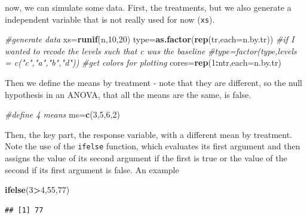 \documentclass[
]{book}
\newenvironment{Shaded}{\begin{snugshade}}{\end{snugshade}}
\newcommand{\AttributeTok}[1]{\textcolor[rgb]{0.13,0.29,0.53}{#1}}
\newcommand{\CommentTok}[1]{\textcolor[rgb]{0.56,0.35,0.01}{\textit{#1}}}
\newcommand{\DecValTok}[1]{\textcolor[rgb]{0.00,0.00,0.81}{#1}}
\newcommand{\FunctionTok}[1]{\textcolor[rgb]{0.13,0.29,0.53}{\textbf{#1}}}
\newcommand{\NormalTok}[1]{#1}
\newcommand{\OtherTok}[1]{\textcolor[rgb]{0.56,0.35,0.01}{#1}}
\newcommand{\SpecialCharTok}[1]{\textcolor[rgb]{0.81,0.36,0.00}{\textbf{#1}}}
\begin{document}
now, we can simulate some data. First, the treatments, but we also generate a independent variable that is not really used for now (\texttt{xs}).

\begin{Shaded}
\begin{Highlighting}[]
\CommentTok{\#generate data}
\NormalTok{xs}\OtherTok{=}\FunctionTok{runif}\NormalTok{(n,}\DecValTok{10}\NormalTok{,}\DecValTok{20}\NormalTok{)}
\NormalTok{type}\OtherTok{=}\FunctionTok{as.factor}\NormalTok{(}\FunctionTok{rep}\NormalTok{(tr,}\AttributeTok{each=}\NormalTok{n.by.tr))}
\CommentTok{\#if I wanted to recode the levels such that c was the baseline}
\CommentTok{\#type=factor(type,levels = c("c","a","b","d"))}
\CommentTok{\#get colors for plotting}
\NormalTok{cores}\OtherTok{=}\FunctionTok{rep}\NormalTok{(}\DecValTok{1}\SpecialCharTok{:}\NormalTok{ntr,}\AttributeTok{each=}\NormalTok{n.by.tr)}
\end{Highlighting}
\end{Shaded}

Then we define the means by treatment - note that they are different, so the null hypothesis in an ANOVA, that all the means are the same, is false.

\begin{Shaded}
\begin{Highlighting}[]
\CommentTok{\#define 4 means}
\NormalTok{ms}\OtherTok{=}\FunctionTok{c}\NormalTok{(}\DecValTok{3}\NormalTok{,}\DecValTok{5}\NormalTok{,}\DecValTok{6}\NormalTok{,}\DecValTok{2}\NormalTok{)}
\end{Highlighting}
\end{Shaded}

Then, the key part, the response variable, with a different mean by treatment. Note the use of the \texttt{ifelse} function, which evaluates its first argument and then assigns the value of its second argument if the first is true or the value of the second if its first argument is false. An example

\begin{Shaded}
\begin{Highlighting}[]
\FunctionTok{ifelse}\NormalTok{(}\DecValTok{3}\SpecialCharTok{\textgreater{}}\DecValTok{4}\NormalTok{,}\DecValTok{55}\NormalTok{,}\DecValTok{77}\NormalTok{)}
\end{Highlighting}
\end{Shaded}

\begin{verbatim}
## [1] 77
\end{verbatim}
\end{document}
